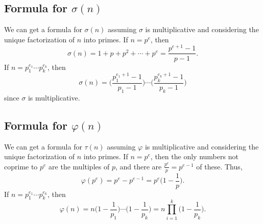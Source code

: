 \subsection*{Formula for $ \sigma(n) $}
We can get a formula for $ \sigma(n) $ assuming $ \sigma $ is multiplicative
and considering the unique factorization of $ n $ into primes.
If $ n=p^e $, then
\[ \sigma(n)=1+p+p^2+\cdots+p^e=\frac{p^{e+1}-1}{p-1}. \]
If $ n=p_1^{e_1}\cdots p_k^{e_k} $, then
\[ \sigma(n)=\biggl(\frac{p_1^{e_1+1}-1}{p_1-1}\biggr)\cdots \biggl(\frac{p_k^{e_k+1}-1}{p_k-1}\biggr) \]
since $ \sigma $ is multiplicative.

\subsection*{Formula for $ \varphi(n) $}
We can get a formula for $ \tau(n) $
assuming $ \varphi $ is multiplicative and considering the unique factorization of $ n $ into primes.
If $ n=p^e $, then the only numbers not coprime to $ p^e $ are the multiples of $ p $, and
there are $ \frac{p^e}{p}=p^{e-1} $ of these. Thus,
\[ \varphi(p^e)=p^e-p^{e-1}=p^e\biggl(1-\frac{1}{p}\biggr). \]
If $ n=p_1^{e_1}\cdots p_k^{e_k} $, then
\[ \varphi(n)=n\biggl(1-\frac{1}{p_1}\biggr)\cdots\biggl(1-\frac{1}{p_k}\biggr)=n\prod_{i=1}^k\biggl(1-\frac{1}{p_k}\biggr). \]

